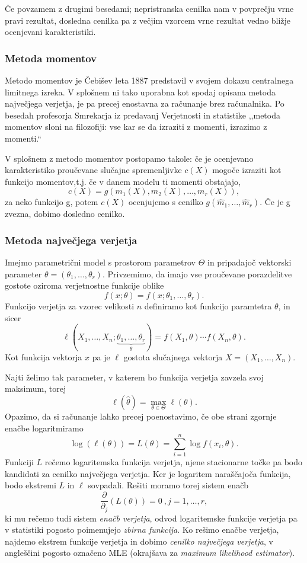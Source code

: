 \documentclass[12pt,a4paper]{amsart}
\theoremstyle{definition} %
\theoremstyle{plain} %
\begin{document}
Če povzamem z drugimi besedami; nepristranska cenilka nam v povprečju vrne pravi rezultat, dosledna cenilka pa z večjim vzorcem vrne rezultat vedno
bližje ocenjevani karakteristiki.

\subsubsection{Metoda momentov}
Metodo momentov je Čebišev leta 1887 predstavil v svojem dokazu centralnega limitnega izreka. V splošnem ni tako uporabna kot spodaj opisana metoda največjega
verjetja, je pa precej enostavna za računanje brez računalnika. Po besedah profesorja Smrekarja iz predavanj Verjetnosti in statistike\:
,,metoda momentov sloni na filozofiji: vse kar se da izraziti z momenti, izrazimo z momenti.``

V splošnem z metodo momentov postopamo takole: če je ocenjevano karakteristiko proučevane slučajne spremenljivke $c(X)$ mogoče izraziti kot funkcijo 
momentov,t.j. če v danem modelu ti momenti obstajajo, 
\[
    c(X) = g(m_{1}(X), m_{2}(X),\ldots,m_{r}(X)),
\] za neko funkcijo g, potem $c(X)$ ocenjujemo s cenilko $g(\hat{m}_{1},\ldots,\hat{m}_{r}).$ Če je g zvezna, dobimo dosledno cenilko.

\subsubsection{Metoda največjega verjetja}
Imejmo parametrični model s prostorom parametrov $\Theta$ in pripadajoč vektorski parameter $\theta = (\theta_{1},\ldots,\theta_{r}).$
Privzemimo, da imajo vse proučevane porazdelitve gostote oziroma verjetnostne funkcije oblike
\[
    f(x;\theta) = f(x;\theta_{1},\ldots,\theta_{r}).
\]
Funkcijo verjetja za vzorec velikosti $n$ definiramo kot funkcijo paramtetra $\theta$, in sicer
\[
    \ell(X_{1},\ldots,X_{n};\underbrace{\theta_{1},\ldots,\theta_{r}}_{\theta}) = f(X_{1},\theta)\cdots f(X_{n},\theta).
\]
Kot funkcija vektorja $x$ pa je $\ell$ gostota slučajnega vektorja $X = (X_{1},\ldots,X_{n}).$

Najti želimo tak parameter, v katerem bo funkcija verjetja zavzela svoj maksimum, torej 
\[
    \ell(\hat{\theta}) = \underset{\theta \in \Theta}{\max}{\ell(\theta)}.
\]
Opazimo, da si računanje lahko precej poenostavimo, če obe strani zgornje enačbe logaritmiramo
\begin{equation}
    \log(\ell(\theta)) = L(\theta) = \sum_{i=1}^{n}\log f(x_{i},\theta).
\end{equation}
Funkciji $L$ rečemo logaritemska funkcija verjetja, njene stacionarne točke pa bodo kandidati za cenilko največjega verjetja. Ker je logaritem 
naraščajoča funkcija, bodo ekstremi $L$ in $\ell$ sovpadali. Rešiti moramo torej sistem enačb
\begin{equation}\label{mle}
    \frac{\partial}{\partial_{j}}(L(\theta)) = 0~,j=1,\ldots,r,
\end{equation}
ki mu rečemo tudi sistem \textit{enačb verjetja}, odvod logaritemske funkcije verjetja pa v statistiki pogosto poimenujejo \textit{zbirna funkcija}.
Ko rešimo enačbe verjetja, najdemo ekstrem funkcije verjetja in dobimo \textit{cenilko največjega verjetja}, v angleščini pogosto označeno MLE (okrajšava za
\textit{maximum likelihood estimator}).
\end{document}

